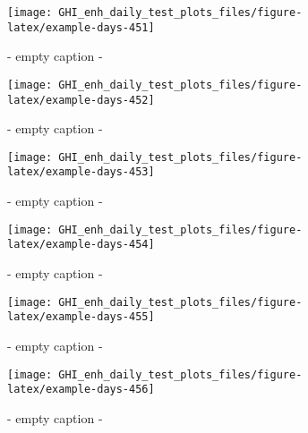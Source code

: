 \documentclass[
  10pt,
  a4paper,oneside]{article}
\begin{document}
\begin{figure}[H]

{\centering \texttt{[image: GHI\_enh\_daily\_test\_plots\_files/figure-latex/example-days-451]} 

}

\caption{ - empty caption - }\label{fig:example-days-451}
\end{figure}

\begin{figure}[H]

{\centering \texttt{[image: GHI\_enh\_daily\_test\_plots\_files/figure-latex/example-days-452]} 

}

\caption{ - empty caption - }\label{fig:example-days-452}
\end{figure}

\begin{figure}[H]

{\centering \texttt{[image: GHI\_enh\_daily\_test\_plots\_files/figure-latex/example-days-453]} 

}

\caption{ - empty caption - }\label{fig:example-days-453}
\end{figure}

\begin{figure}[H]

{\centering \texttt{[image: GHI\_enh\_daily\_test\_plots\_files/figure-latex/example-days-454]} 

}

\caption{ - empty caption - }\label{fig:example-days-454}
\end{figure}

\begin{figure}[H]

{\centering \texttt{[image: GHI\_enh\_daily\_test\_plots\_files/figure-latex/example-days-455]} 

}

\caption{ - empty caption - }\label{fig:example-days-455}
\end{figure}

\begin{figure}[H]

{\centering \texttt{[image: GHI\_enh\_daily\_test\_plots\_files/figure-latex/example-days-456]} 

}

\caption{ - empty caption - }\label{fig:example-days-456}
\end{figure}
\end{document}
